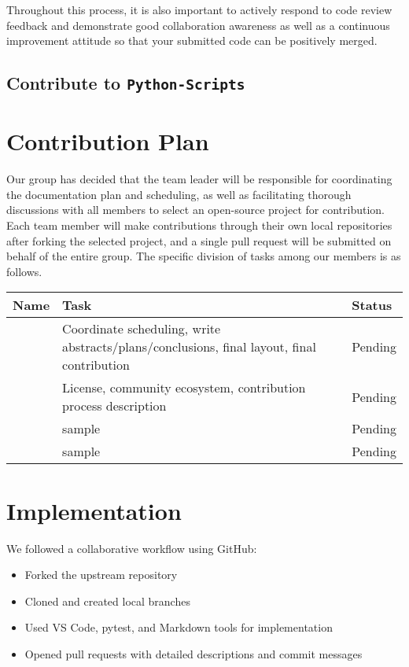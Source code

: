 \documentclass[12pt]{article}
\begin{document}
Throughout this process, it is also important to actively respond to code review feedback and demonstrate good collaboration awareness as well as a continuous improvement attitude so that your submitted code can be positively merged.

\subsection{Contribute to \texttt{Python-Scripts}}



\section{Contribution Plan}

Our group has decided that the team leader will be responsible for coordinating the documentation plan and scheduling, as well as facilitating thorough discussions with all members to select an open-source project for contribution. Each team member will make contributions through their own local repositories after forking the selected project, and a single pull request will be submitted on behalf of the entire group. The specific division of tasks among our members is as follows.

\begin{longtable}{|p{3cm}|p{7cm}|p{3cm}|}
\hline
\textbf{Name} & \textbf{Task} & \textbf{Status} \\
\hline
 & Coordinate scheduling, write abstracts/plans/conclusions, final layout, final contribution & Pending \\
\hline
 & License, community ecosystem, contribution process description & Pending \\
\hline
 & sample & Pending \\
\hline
 & sample & Pending \\
\hline
\end{longtable}

\section{Implementation}

We followed a collaborative workflow using GitHub:

\begin{itemize}
    \item Forked the upstream repository
    \item Cloned and created local branches
    \item Used VS Code, pytest, and Markdown tools for implementation
    \item Opened pull requests with detailed descriptions and commit messages
\end{itemize}
\end{document}
